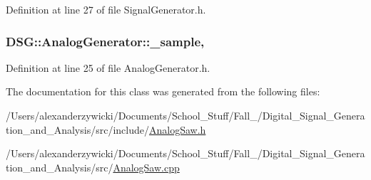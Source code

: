 Definition at line 27 of file Signal\+Generator.\+h.

\hypertarget{classDSG_1_1AnalogGenerator_ac88ad591cac37f636c2f7b460480bef9}{
\subsubsection[{\+\_\+sample}]{ D\+S\+G\+::\+Analog\+Generator\+::\+\_\+sample\hspace{0.3cm}{\ttfamily [protected]}, {\ttfamily [inherited]}}}\label{classDSG_1_1AnalogGenerator_ac88ad591cac37f636c2f7b460480bef9}


Definition at line 25 of file Analog\+Generator.\+h.



The documentation for this class was generated from the following files\+:\begin{DoxyCompactItemize}
\item 
/\+Users/alexanderzywicki/\+Documents/\+School\+\_\+\+Stuff/\+Fall\+\_/\+Digital\+\_\+\+Signal\+\_\+\+Generation\+\_\+and\+\_\+\+Analysis/src/include/\hyperlink{AnalogSaw_8h}{Analog\+Saw.\+h}\item 
/\+Users/alexanderzywicki/\+Documents/\+School\+\_\+\+Stuff/\+Fall\+\_/\+Digital\+\_\+\+Signal\+\_\+\+Generation\+\_\+and\+\_\+\+Analysis/src/\hyperlink{AnalogSaw_8cpp}{Analog\+Saw.\+cpp}\end{DoxyCompactItemize}
